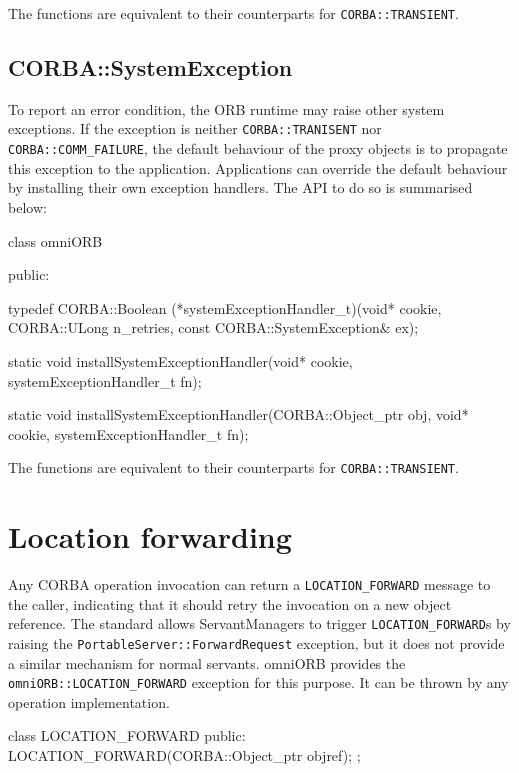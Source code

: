 \documentclass[11pt,twoside,a4paper]{book}
\newcommand{\code}[1]{\texttt{#1}}
\begin{document}
The functions are equivalent to their counterparts for
\code{CORBA::TRANSIENT}.


\subsection{CORBA::SystemException}

To report an error condition, the ORB runtime may raise other system
exceptions. If the exception is neither \code{CORBA::TRANISENT} nor
\code{CORBA::COMM\_FAILURE}, the default behaviour of the proxy
objects is to propagate this exception to the application.
Applications can override the default behaviour by installing their
own exception handlers. The API to do so is summarised below:


\begin{cxxlisting}
class omniORB {
public:

typedef CORBA::Boolean (*systemExceptionHandler_t)(void* cookie,
                                            CORBA::ULong n_retries,
                                            const CORBA::SystemException& ex);

static void installSystemExceptionHandler(void* cookie,
                                          systemExceptionHandler_t fn);

static void installSystemExceptionHandler(CORBA::Object_ptr obj,
                                          void* cookie,
                                          systemExceptionHandler_t fn);
}
\end{cxxlisting}

The functions are equivalent to their counterparts for
\code{CORBA::TRANSIENT}.



\section{Location forwarding}
\label{sec:locationForward}

Any CORBA operation invocation can return a \code{LOCATION\_FORWARD}
message to the caller, indicating that it should retry the invocation
on a new object reference. The standard allows ServantManagers to
trigger \code{LOCATION\_FORWARD}s by raising the
\code{PortableServer::ForwardRequest} exception, but it does not
provide a similar mechanism for normal servants. omniORB provides the
\code{omniORB::LOCATION\_FORWARD} exception for this purpose. It can
be thrown by any operation implementation.

\begin{cxxlisting}
class LOCATION_FORWARD {
public:
  LOCATION_FORWARD(CORBA::Object_ptr objref);
};
\end{cxxlisting}
\end{document}
